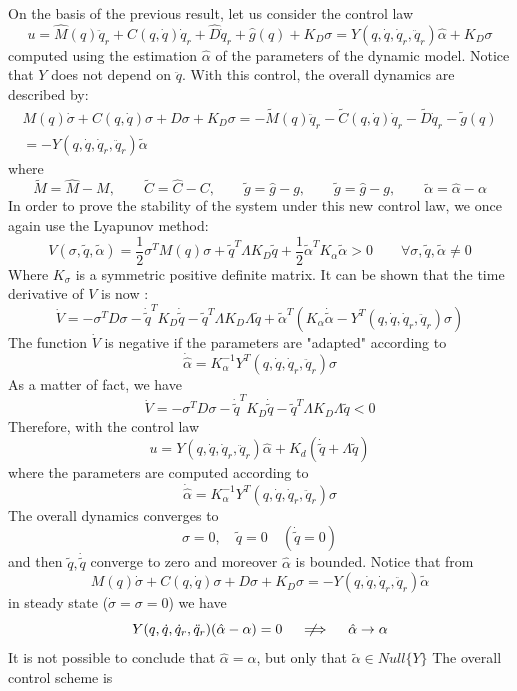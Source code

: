 \documentclass{book}
\newcommand{\notimplies}{%
  \mathrel{{\ooalign{\hidewidth$\not\phantom{=}$\hidewidth\cr$\implies$}}}}
\begin{document}
On the basis of the previous result, let us consider the control law 
\[
    u = \hat{M}(q)\ddot{q}_r+\hat{C}(q,\dot{q})\dot{q}_r+\hat{D}\dot{q}_r+\hat{g}(q)+K_D\sigma = Y(q,\dot{q},\dot{q}_r,\ddot{q}_r)\hat{\alpha}+K_D\sigma
\]
computed using the estimation $\hat{\alpha}$ of the parameters of the dynamic model.
Notice that $Y$ does not depend on $\ddot{q}$. 
With this control, the overall dynamics are described by:
\begin{gather*}
    M(q)\dot{\sigma}+C(q,\dot{q})\sigma+D\sigma+K_D\sigma=-\tilde{M}(q)\ddot{q}_r-\tilde{C}(q,\dot{q})\dot{q}_r-\tilde{D}\dot{q}_r-\tilde{g}(q)\\
    =-Y(q,\dot{q},\dot{q}_r,\ddot{q}_r)\tilde{\alpha}
\end{gather*}
where
\[
    \tilde{M}=\hat{M}-M, \qquad \tilde{C}=\hat{C}-C, \qquad \tilde{g}=\hat{g}-g, \qquad \tilde{g}=\hat{g}-g, \qquad \tilde{\alpha}=\hat{\alpha}-\alpha 
\]
In order to prove the stability of the system under this new control law, we once again use the Lyapunov method: 
\[
    V(\sigma,\tilde{q},\tilde{\alpha})=\displaystyle\frac{1}{2}\sigma^TM(q)\sigma+\tilde{q}^T\Lambda K_D\tilde{q}+\displaystyle\frac{1}{2}\tilde{\alpha}^TK_\alpha \tilde{\alpha}>0 \qquad \forall \sigma,\tilde{q},\tilde{\alpha}\neq 0
\]
Where $K_\sigma$ is a symmetric positive definite matrix. It can be shown that the time derivative of $V$ is now : 
\[
    \dot{V}=-\sigma^TD\sigma-\dot{\tilde{q}}^TK_D\dot{\tilde{q}}-\tilde{q}^T\Lambda K_D \Lambda\tilde{q} + \tilde{\alpha}^T(K_\alpha\dot{\tilde{\alpha}}-Y^T(q,\dot{q},\dot{q}_r,\ddot{q}_r)\sigma)
\]
The function $\dot{V}$ is negative if the parameters are "adapted" according to 
\[
    \dot{\hat{\alpha}}=K_\alpha^{-1}Y^T(q,\dot{q},\dot{q}_r,\ddot{q}_r)\sigma
\]
As a matter of fact, we have 
\[
    \dot{V}=-\sigma^TD\sigma-\dot{\tilde{q}}^TK_D\dot{\tilde{q}}-\tilde{q}^T\Lambda K_D\Lambda\tilde{q}<0
\]
Therefore, with the control law 
\[
    u=Y(q,\dot{q},\dot{q}_r,\ddot{q}_r)\hat{\alpha}+K_d(\dot{\tilde{q}}+\Lambda\tilde{q})
\]
where the parameters are computed according to 
\[
    \dot{\hat{\alpha}}=K_\alpha^{-1}Y^T(q,\dot{q},\dot{q}_r,\ddot{q}_r)\sigma
\]
The overall dynamics converges to 
\[
    \sigma=0,\quad \tilde{q}=0 \quad (\dot{\tilde{q}}=0)
\]
and then $\tilde{q},\dot{\tilde{q}}$ converge to zero and moreover $\hat{\alpha}$ is bounded. Notice that from 
\[
    M(q)\dot{\sigma}+C(q,\dot{q})\sigma+D\sigma+K_D\sigma=- Y(q,\dot{q},\dot{q}_r,\ddot{q}_r)\tilde{\alpha}
\]
in steady state ($\dot{\sigma}=\sigma=0$) we have 
\[
    Y(q,\dot{q},\dot{q}_r,\ddot{q}_r)(\hat{\alpha}-\alpha)=0\quad \notimplies \quad \hat{\alpha}\to\alpha
\]
It is not possible to conclude that $\hat{\alpha}=\alpha$, but only that $\tilde{\alpha}\in Null\{Y\}$
The overall control scheme is 
\end{document}
